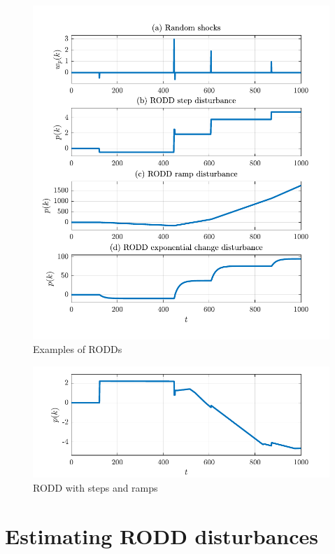 \begin{figure}[htp]
	\centering
	\includegraphics[width=13.5cm]{images/rodd_sim_plots.pdf}
	\caption{Examples of RODDs}
	\label{fig:rodd-sim-plots}
\end{figure}

\begin{figure}[htp]
	\centering
	\includegraphics[width=13.5cm]{images/rodd_sim_plot2.pdf}
	\caption{RODD with steps and ramps}
	\label{fig:rodd-sim-plot2}
\end{figure}


\section{Estimating RODD disturbances} \label{sim-obs-lin}

